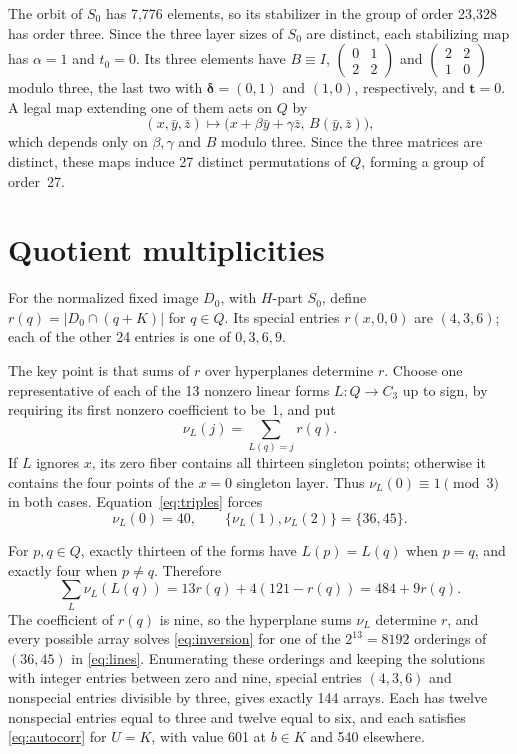 \documentclass[11pt]{article}
\begin{document}
The orbit of $S_0$ has 7,776 elements, so its stabilizer in the group
of order 23,328 has order three. Since the three layer sizes of $S_0$
are distinct, each stabilizing map has $\alpha=1$ and $t_0=0$. Its
three elements have
$B\equiv I$, $\left(\begin{smallmatrix}0&1\\2&2\end{smallmatrix}\right)$
and $\left(\begin{smallmatrix}2&2\\1&0\end{smallmatrix}\right)$
modulo three, the last two with $\boldsymbol\delta=(0,1)$ and $(1,0)$,
respectively, and $\boldsymbol t=0$. A legal map extending one of them
acts on $Q$ by
\[
 (x,\bar y,\bar z)\longmapsto\bigl(x+\beta\bar y+\gamma\bar z,\,
 B(\bar y,\bar z)\bigr),
\]
which depends only on $\beta,\gamma$ and $B$ modulo three. Since the
three matrices are distinct, these maps induce 27 distinct permutations
of $Q$, forming a group of order~27.

\section{Quotient multiplicities}\label{sec:quotient}

For the normalized fixed image $D_0$, with $H$-part $S_0$, define
$r(q)=|D_0\cap(q+K)|$ for $q\in Q$. Its special entries
$r(x,0,0)$ are $(4,3,6)$; each of the other 24
entries is one of $0,3,6,9$.

The key point is that sums of $r$ over hyperplanes determine $r$.
Choose one representative of each of the 13 nonzero linear forms
$L:Q\to C_3$ up to sign, by requiring its first nonzero
coefficient to be~1, and put
\[
 \nu_L(j)=\sum_{L(q)=j}r(q).
\]
If $L$ ignores $x$, its zero fiber contains all thirteen
singleton points; otherwise it contains the four points of
the $x=0$ singleton layer. Thus $\nu_L(0)\equiv1\pmod3$ in
both cases. Equation~\eqref{eq:triples} forces
\begin{equation}\label{eq:lines}
 \nu_L(0)=40,\qquad \{\nu_L(1),\nu_L(2)\}=\{36,45\}.
\end{equation}

For $p,q\in Q$, exactly thirteen of the forms have
$L(p)=L(q)$ when $p=q$, and exactly four when $p\ne q$.
Therefore
\begin{equation}\label{eq:inversion}
 \sum_L\nu_L(L(q))=13r(q)+4(121-r(q))=484+9r(q).
\end{equation}
The coefficient of $r(q)$ is nine, so the hyperplane sums $\nu_L$
determine $r$, and every possible array solves \eqref{eq:inversion}
for one of the $2^{13}=8192$ orderings of $(36,45)$ in
\eqref{eq:lines}. Enumerating these orderings and keeping the solutions with integer entries between zero and nine,
special entries $(4,3,6)$ and nonspecial entries divisible by three,
gives exactly 144 arrays. Each has twelve nonspecial entries
equal to three and twelve equal to six, and each satisfies
\eqref{eq:autocorr} for $U=K$, with value 601 at $b\in K$ and 540
elsewhere.
\end{document}
